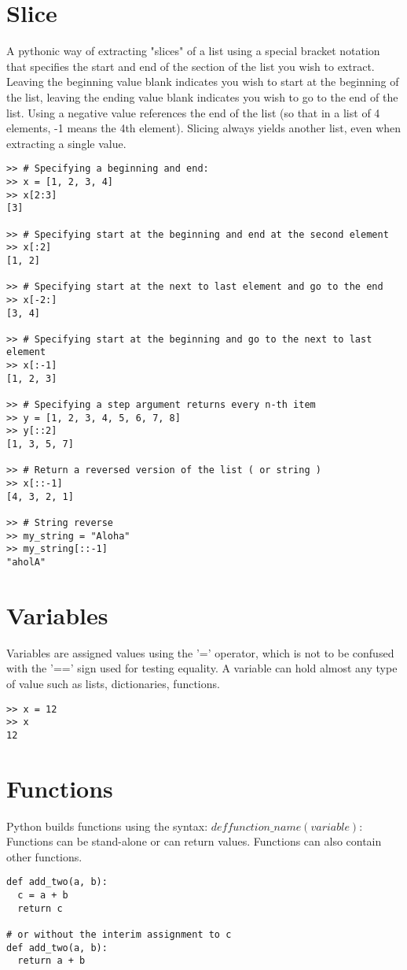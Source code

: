 \documentclass[12pt,a4paper,final,twoside,onecolumn,titlepage]{book}
\begin{document}
\section{Slice}
A pythonic way of extracting "slices" of a list using a special bracket notation that specifies the start and end of the section of the list you wish to extract. Leaving the beginning value blank indicates you wish to start at the beginning of the list, leaving the ending value blank indicates you wish to go to the end of the list. Using a negative value references the end of the list (so that in a list of 4 elements, -1 means the 4th element). Slicing always yields another list, even when extracting a single value. 
\lstset{language=Python, tabsize=4}
\begin{lstlisting}
>> # Specifying a beginning and end:
>> x = [1, 2, 3, 4]
>> x[2:3]
[3]

>> # Specifying start at the beginning and end at the second element
>> x[:2]
[1, 2]

>> # Specifying start at the next to last element and go to the end
>> x[-2:]
[3, 4]

>> # Specifying start at the beginning and go to the next to last element
>> x[:-1]
[1, 2, 3]

>> # Specifying a step argument returns every n-th item
>> y = [1, 2, 3, 4, 5, 6, 7, 8]
>> y[::2]
[1, 3, 5, 7]

>> # Return a reversed version of the list ( or string )
>> x[::-1]
[4, 3, 2, 1]

>> # String reverse
>> my_string = "Aloha"
>> my_string[::-1]
"aholA"
\end{lstlisting}

\section{Variables}
Variables are assigned values using the '=' operator, which is not to be confused with the '==' sign used for testing equality. A variable can hold almost any type of value such as lists, dictionaries, functions. 
\lstset{language=Python, tabsize=4}
\begin{lstlisting}
>> x = 12
>> x
12
\end{lstlisting}

\section{Functions}
 Python builds functions using the syntax: $def function\_name(variable): $ Functions can be stand-alone or can return values. Functions can also contain other functions.
\lstset{language=Python, tabsize=4}
\begin{lstlisting}
def add_two(a, b):
  c = a + b
  return c

# or without the interim assignment to c
def add_two(a, b):
  return a + b
\end{lstlisting}
\end{document}
